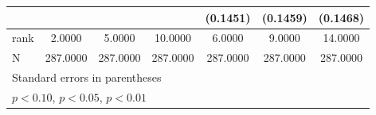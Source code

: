 {\begin{tabular}{l*{6}{c}}
                    &                     &                     &                     &    (0.1451)         &    (0.1459)         &    (0.1468)         \\
\midrule
rank                &      2.0000         &      5.0000         &     10.0000         &      6.0000         &      9.0000         &     14.0000         \\
N                   &    287.0000         &    287.0000         &    287.0000         &    287.0000         &    287.0000         &    287.0000         \\
\bottomrule
\multicolumn{7}{l}{\footnotesize Standard errors in parentheses}\\
\multicolumn{7}{l}{\footnotesize \sym{*} \(p<0.10\), \sym{**} \(p<0.05\), \sym{***} \(p<0.01\)}\\
\end{tabular}
}
